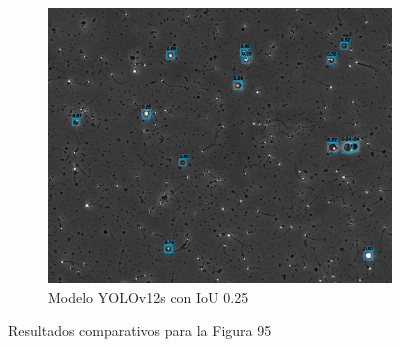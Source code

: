 \documentclass[12pt,a4paper,onecolumn,oneside]{report}
\begin{document}
\begin{figure}[H]
  \vspace{0.3cm}
  \begin{subfigure}[b]{0.48\textwidth}
    \centering
    \includegraphics[width=\textwidth]{figuras/evaluacion_cualitativa/95/95_v12_IoU0.25.jpg}
    \caption{Modelo YOLOv12s con IoU 0.25}
    \label{figyolov12s_IoU0.25_image_95}
  \end{subfigure}
  
  \caption{Resultados comparativos para la Figura 95}
  \label{fig:95}
\end{figure}
\end{document}
